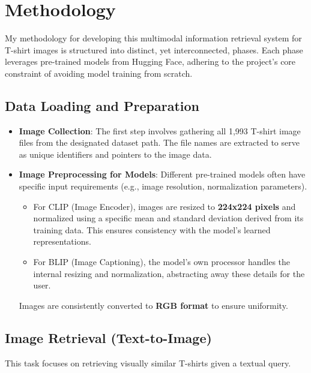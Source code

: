\documentclass{article}
\begin{document}
\section{Methodology}
\label{sec:methodology}


My methodology for developing this multimodal information retrieval system for T-shirt images is structured into distinct, yet interconnected, phases. Each phase leverages pre-trained models from Hugging Face, adhering to the project's core constraint of avoiding model training from scratch.

\subsection{Data Loading and Preparation}
\begin{itemize}
    \item \textbf{Image Collection}: The first step involves gathering all 1,993 T-shirt image files from the designated dataset path. The file names are extracted to serve as unique identifiers and pointers to the image data.
    \item \textbf{Image Preprocessing for Models}: Different pre-trained models often have specific input requirements (e.g., image resolution, normalization parameters).
    \begin{itemize}
        \item For CLIP (Image Encoder), images are resized to \textbf{224x224 pixels} and normalized using a specific mean and standard deviation derived from its training data. This ensures consistency with the model's learned representations.
        \item For BLIP (Image Captioning), the model's own processor handles the internal resizing and normalization, abstracting away these details for the user.
    \end{itemize}
    Images are consistently converted to \textbf{RGB format} to ensure uniformity.
\end{itemize}

\subsection{Image Retrieval (Text-to-Image)}
This task focuses on retrieving visually similar T-shirts given a textual query.
\end{document}
